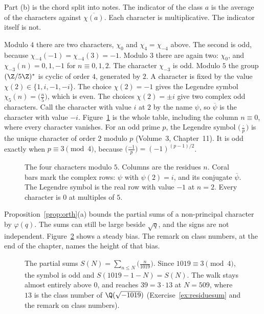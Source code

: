 Part (b) is the chord split into notes. The indicator of the class $a$ is the average of the characters against $\overline{\chi(a)}$. Each character is multiplicative. The indicator itself is not.

\begin{example}\label{ex:smallchars}
Modulo $4$ there are two characters, $\chi_0$ and $\chi_4=\chi_{-4}$ above. The second is odd, because $\chi_{-4}(-1)=\chi_{-4}(3)=-1$. Modulo $3$ there are again two: $\chi_0$, and $\chi_{-3}(n)=0,1,-1$ for $n\equiv0,1,2$. The character $\chi_{-3}$ is odd. Modulo $5$ the group $(\Z/5\Z)^*$ is cyclic of order $4$, generated by $2$. A character is fixed by the value $\chi(2)\in\{1,i,-1,-i\}$. The choice $\chi(2)=-1$ gives the Legendre symbol $\chi_5(n)=\bigl(\frac n5\bigr)$, which is even. The choices $\chi(2)=\pm i$ give two complex odd characters. Call the character with value $i$ at $2$ by the name $\psi$, so $\overline\psi$ is the character with value $-i$. Figure~\ref{fig:mod5grid} is the whole table, including the column $n\equiv0$, where every character vanishes. For an odd prime $p$, the Legendre symbol $\bigl(\frac\cdot p\bigr)$ is the unique character of order $2$ modulo $p$ (Volume~3, Chapter~11). It is odd exactly when $p\equiv3\pmod4$, because $\bigl(\frac{-1}p\bigr)=(-1)^{(p-1)/2}$.
\end{example}

\begin{figure}[ht]
\centering
{}
\caption{The four characters modulo $5$. Columns are the residues $n$. Coral bars mark the complex rows: $\psi$ with $\psi(2)=i$, and its conjugate $\overline\psi$. The Legendre symbol is the real row with value $-1$ at $n=2$. Every character is $0$ at multiples of $5$.}
\label{fig:mod5grid}
\end{figure}

Proposition~\ref{prop:orth}(a) bounds the partial sums of a non-principal character by $\varphi(q)$. The sums can still be large beside $\sqrt q$, and the signs are not independent. Figure~\ref{fig:charsums} shows a steady bias. The remark on class numbers, at the end of the chapter, names the height of that bias.

\begin{figure}[ht]
\centering
{}
\caption{The partial sums $S(N)=\sum_{n\le N}\bigl(\frac n{1019}\bigr)$. Since $1019\equiv3\pmod4$, the symbol is odd and $S(1019-1-N)=S(N)$. The walk stays
almost entirely above $0$, and reaches $39=3\cdot13$ at $N=509$, where $13$ is the class number of $\Q(\sqrt{-1019})$
(Exercise~\ref{ex:residuesum} and the remark on class numbers).}
\label{fig:charsums}
\end{figure}


